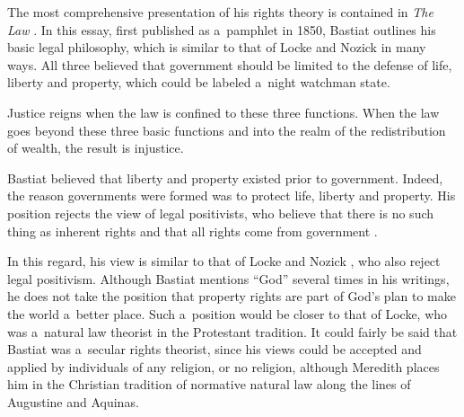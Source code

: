 The most comprehensive presentation of his rights theory is contained in \textit{The Law} 
\parencites[][pp.342–393]{bastiat_ce_1873}[][]{bastiat_law_1998}[][]{}. %
 In this essay, first published as a~pamphlet in 1850, Bastiat outlines his basic legal philosophy, which is similar to that of Locke 
\parencite*[][]{locke_two_1689} %
 and Nozick 
\parencite*[][]{} %
 in many ways. All three believed that government should be limited to the defense of life, liberty and property, which could be labeled a~night watchman state.



Justice reigns when the law is confined to these three functions. When the law goes beyond these three basic functions and into the realm of the redistribution of wealth, the result is injustice.



Bastiat believed that liberty and property existed prior to government. Indeed, the reason governments were formed was to protect life, liberty and property. His position rejects the view of legal positivists, who believe that there is no such thing as inherent rights and that all rights come from government 
\parencites[][]{bentham_anarchical_1843}[][]{austin_lectures_1869}[][]{fuller_morality_1969}[][]{kramer_defense_1999}[][]{marmor_positive_2001}[][]{waldron_nonsense_1987}.%




In this regard, his view is similar to that of Locke 
\parencite*[][]{locke_two_1689} %
 and Nozick 
\parencite*[][]{}, %
 who also reject legal positivism. Although Bastiat mentions ``God'' several times in his writings, he does not take the position that property rights are part of God's plan to make the world a~better place. Such a~position would be closer to that of Locke, who was a~natural law theorist in the Protestant tradition. It could fairly be said that Bastiat was a~secular rights theorist, since his views could be accepted and applied by individuals of any religion, or no religion, although Meredith 
\parencite*[][]{meredith_taxation_2009} %
 places him in the Christian tradition of normative natural law along the lines of Augustine and Aquinas.



